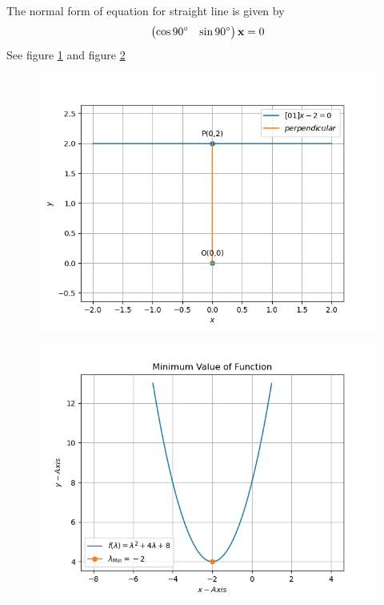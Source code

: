 \documentclass[12pt]{article}
\newcommand{\myvec}[1]{\ensuremath{\begin{pmatrix}#1\end{pmatrix}}}
\let\vec\mathbf
\begin{document}
The normal form of equation for straight line is given by 
\begin{align}
	\myvec{\cos{90}\degree&\sin{90}\degree}\vec{x} = 0
\end{align}
See figure \ref{fig:Fig1} and figure \ref{fig:Fig2}
\begin{figure}[!h]
	\begin{center} 
	    \includegraphics[width=\columnwidth]{figs/opt1}
	\end{center}
\caption{}
\label{fig:Fig1}
\end{figure}
\begin{figure}[!h]
	\begin{center} 
	    \includegraphics[width=\columnwidth]{figs/opt2}
	\end{center}
\caption{}
\label{fig:Fig2}
\end{figure}
\end{document}
